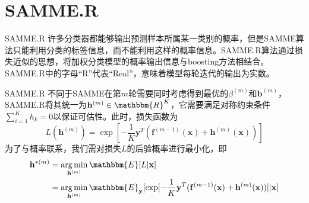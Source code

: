 \documentclass{ctexbeamer}        %
\begin{document}
\section{SAMME.R}
\begin{frame}{SAMME.R}
许多分类器都能够输出预测样本所属某一类别的概率，但是SAMME算法只能利用分类的标签信息，而不能利用这样的概率信息。SAMME.R算法通过损失近似的思想，将加权分类模型的概率输出信息与boosting方法相结合。SAMME.R中的字母“R”代表“Real”，意味着模型每轮迭代的输出为实数。
\end{frame}

\begin{frame}{SAMME.R}
不同于SAMME在第$m$轮需要同时考虑得到最优的$\beta^{(m)}$和$\mathbf{b}^{(m)}$，SAMME.R将其统一为$\mathbf{h}^{(m)}\in \mathbbm{R}^K$，它需要满足对称约束条件$\sum_{i=1}^K h_k=0$以保证可估性。此时，损失函数为
$$
L(\mathbf{h}^{(m)})=\exp[-\frac{1}{K}\mathbf{y}^T(\mathbf{f}^{(m-1)}(\mathbf{x})+\mathbf{h}^{(m)}(\mathbf{x}))]
$$
为了与概率联系，我们需对损失$L$的后验概率进行最小化，即
\begin{align*}
\mathbf{h}^{*(m)}&=\mathop{\arg\min}_{\mathbf{h}^{(m)}} \mathbbm{E} [L\vert \mathbf{x}]\\
&=\mathop{\arg\min}_{\mathbf{h}^{(m)}} \mathbbm{E}_{\mathbf{y}}[ \exp[-\frac{1}{K}\mathbf{y}^T(\mathbf{f}^{(m-1)}(\mathbf{x})+\mathbf{h}^{(m)}(\mathbf{x}))]\vert \mathbf{x}]
\end{align*}
\end{frame}
\end{document}
